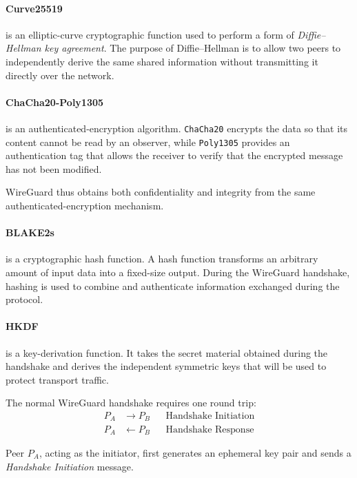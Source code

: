 \paragraph{Curve25519} is an elliptic-curve cryptographic function used to perform a form of \textit{Diffie--Hellman key agreement}. The purpose of Diffie--Hellman is to allow two peers to independently derive the same shared information without transmitting it directly over the network.

\paragraph{ChaCha20-Poly1305} is an authenticated-encryption algorithm. \texttt{ChaCha20} encrypts the data so that its content cannot be read by an observer, while \texttt{Poly1305} provides an authentication tag that allows the receiver to verify that the encrypted message has not been modified.

WireGuard thus obtains both confidentiality and integrity from the same authenticated-encryption mechanism.

\paragraph{BLAKE2s} is a cryptographic hash function. A hash function transforms an arbitrary amount of input data into a fixed-size output. During the WireGuard handshake, hashing is used to combine and authenticate information exchanged during the protocol.

\paragraph{HKDF} is a key-derivation function. It takes the secret material obtained during the handshake and derives the independent symmetric keys that will be used to protect transport traffic.

\newpage
The normal WireGuard handshake requires one round trip:
\[
	\begin{aligned}
		P_A & \longrightarrow P_B
		    &                     & \text{Handshake Initiation} \\
		P_A & \longleftarrow P_B
		    &                     & \text{Handshake Response}
	\end{aligned}
\]

Peer \(P_A\), acting as the initiator, first generates an ephemeral key pair and sends a \textit{Handshake Initiation} message.

